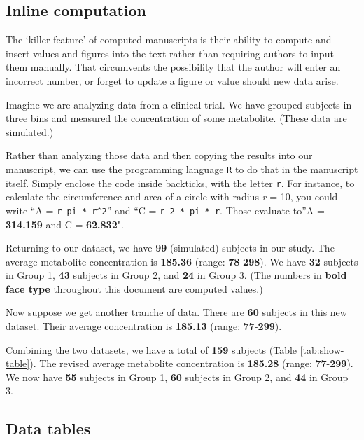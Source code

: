 \documentclass[smallextended]{svjour3}       %
\begin{document}
\hypertarget{sec:1}{%
\subsection{Inline computation}\label{sec:1}}

The `killer feature' of computed manuscripts is their ability to compute and insert values and figures into the text rather than requiring authors to input them manually. That circumvents the possibility that the author will enter an incorrect number, or forget to update a figure or value should new data arise.

Imagine we are analyzing data from a clinical trial. We have grouped subjects in three bins and measured the concentration of some metabolite. (These data are simulated.)

Rather than analyzing those data and then copying the results into our manuscript, we can use the programming language \texttt{R} to do that in the manuscript itself. Simply enclose the code inside backticks, with the letter \texttt{r}. For instance, to calculate the circumference and area of a circle with radius \emph{r} = 10, you could write ``A = \texttt{\textasciigrave{}r\ pi\ *\ r\^{}2\textasciigrave{}}'' and ``C = \texttt{\textasciigrave{}r\ 2\ *\ pi\ *\ r\textasciigrave{}}. Those evaluate to''A = \textbf{314.159} and C = \textbf{62.832}".

Returning to our dataset, we have \textbf{99} (simulated) subjects in our study. The average metabolite concentration is \textbf{185.36} (range: \textbf{78}-\textbf{298}). We have \textbf{32} subjects in Group 1, \textbf{43} subjects in Group 2, and \textbf{24} in Group 3. (The numbers in \textbf{bold face type} throughout this document are computed values.)

Now suppose we get another tranche of data. There are \textbf{60} subjects in this new dataset. Their average concentration is \textbf{185.13} (range: \textbf{77}-\textbf{299}).

Combining the two datasets, we have a total of \textbf{159} subjects (Table \ref{tab:show-table}). The revised average metabolite concentration is \textbf{185.28} (range: \textbf{77}-\textbf{299}). We now have \textbf{55} subjects in Group 1, \textbf{60} subjects in Group 2, and \textbf{44} in Group 3.

\hypertarget{sec:2}{%
\subsection{Data tables}\label{sec:2}}
\end{document}

